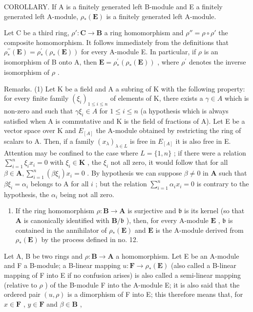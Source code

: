COROLLARY. If A is a finitely generated left B-module and E a finitely generated left A-module, \(\rho_{*}(\mathbf{E})\) is a finitely generated left A-module.

Let C be a third ring, \(\rho':\mathbf{C}\to\mathbf{B}\) a ring homomorphism and \(\rho''=\rho\circ\rho'\) the composite homomorphism. It follows immediately from the definitions that \(\rho_{*}^{\prime \prime}(\mathbf{E}) = \rho_{*}^{\prime}(\rho_{*}(\mathbf{E}))\) for every A-module E. In particular, if \(\rho\) is an isomorphism of B onto A, then \(\mathbf{E} = \rho_{*}^{\prime}(\rho_{*}(\mathbf{E}))\) , where \(\rho^{\prime}\) denotes the inverse isomorphism of \(\rho\) .

Remarks. (1) Let K be a field and A a subring of K with the following property: for every finite family \((\xi_{i})_{1\leqslant i\leqslant n}\) of elements of K, there exists a \(\gamma\in A\) which is non-zero and such that \(\gamma\xi_{i}\in A\) for \(1\leqslant i\leqslant n\) (a hypothesis which is always satisfied when A is commutative and K is the field of fractions of A). Let E be a vector space over K and \(E_{[A]}\) the A-module obtained by restricting the ring of scalars to A. Then, if a family \((x_{\lambda})_{\lambda\in L}\) is free in \(E_{[A]}\) it is also free in E. Attention may be confined to the case where \(L=\{1,n\}\) ; if there were a relation \(\sum_{i=1}^{n} \xi_i x_i = 0\) with \(\xi_i \in \mathbf{K}\) , the \(\xi_i\) not all zero, it would follow that for all \(\beta \in \mathbf{A}, \sum_{i=1}^{n} (\beta \xi_i) x_i = 0\) . By hypothesis we can suppose \(\beta \neq 0\) in \(\mathbf{A}\) such that \(\beta \xi_{i} = \alpha_{i}\) belongs to A for all \(i\) ; but the relation \(\sum_{i=1}^{n} \alpha_{i} x_{i} = 0\) is contrary to the hypothesis, the \(\alpha_{i}\) being not all zero.

\begin{enumerate}
\def\labelenumi{(\arabic{enumi})}
\setcounter{enumi}{1}
\tightlist
\item
  If the ring homomorphism \(\rho: \mathbf{B} \to \mathbf{A}\) is surjective and \(\mathfrak{b}\) is its kernel (so that \(\mathbf{A}\) is canonically identified with \(\mathbf{B} / \mathfrak{b}\) ), then, for every A-module \(\mathbf{E}\) , \(\mathfrak{b}\) is contained in the annihilator of \(\rho_*(\mathbf{E})\) and \(\mathbf{E}\) is the A-module derived from \(\rho_*(\mathbf{E})\) by the process defined in no. 12.
\end{enumerate}

Let A, B be two rings and \(\rho: \mathbf{B} \to \mathbf{A}\) a homomorphism. Let E be an A-module and F a B-module; a B-linear mapping \(u: \mathbf{F} \to \rho_{*}(\mathbf{E})\) (also called a B-linear mapping of F into E if no confusion arises) is also called a semi-linear mapping (relative to \(\rho\) ) of the B-module F into the A-module E; it is also said that the ordered pair \((u, \rho)\) is a dimorphism of F into E; this therefore means that, for \(x \in \mathbf{F}\) , \(y \in \mathbf{F}\) and \(\beta \in \mathbf{B}\) ,

